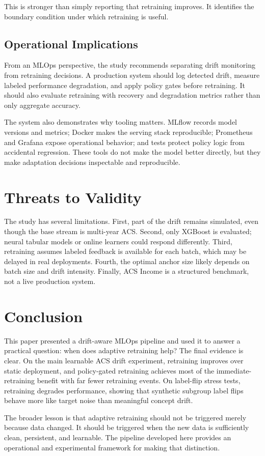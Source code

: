 \documentclass[conference]{IEEEtran}
\begin{document}
This is stronger than simply reporting that retraining improves. It identifies the boundary condition under which retraining is useful.

\subsection{Operational Implications}
From an MLOps perspective, the study recommends separating drift monitoring from retraining decisions. A production system should log detected drift, measure labeled performance degradation, and apply policy gates before retraining. It should also evaluate retraining with recovery and degradation metrics rather than only aggregate accuracy.

The system also demonstrates why tooling matters. MLflow records model versions and metrics; Docker makes the serving stack reproducible; Prometheus and Grafana expose operational behavior; and tests protect policy logic from accidental regression. These tools do not make the model better directly, but they make adaptation decisions inspectable and reproducible.

\section{Threats to Validity}
The study has several limitations. First, part of the drift remains simulated, even though the base stream is multi-year ACS. Second, only XGBoost is evaluated; neural tabular models or online learners could respond differently. Third, retraining assumes labeled feedback is available for each batch, which may be delayed in real deployments. Fourth, the optimal anchor size likely depends on batch size and drift intensity. Finally, ACS Income is a structured benchmark, not a live production system.

\section{Conclusion}
This paper presented a drift-aware MLOps pipeline and used it to answer a practical question: when does adaptive retraining help? The final evidence is clear. On the main learnable ACS drift experiment, retraining improves over static deployment, and policy-gated retraining achieves most of the immediate-retraining benefit with far fewer retraining events. On label-flip stress tests, retraining degrades performance, showing that synthetic subgroup label flips behave more like target noise than meaningful concept drift.

The broader lesson is that adaptive retraining should not be triggered merely because data changed. It should be triggered when the new data is sufficiently clean, persistent, and learnable. The pipeline developed here provides an operational and experimental framework for making that distinction.

\balance


\end{document}
